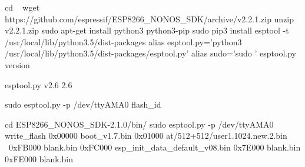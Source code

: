 

\begin{console}
cd ~
wget https://github.com/espressif/ESP8266_NONOS_SDK/archive/v2.2.1.zip
unzip v2.2.1.zip
sudo apt-get install python3 python3-pip
sudo pip3 install esptool -t /usr/local/lib/python3.5/dist-packages
alias esptool.py='python3 /usr/local/lib/python3.5/dist-packages/esptool.py'
alias sudo='sudo '
esptool.py version
\end{console}

\begin{screensmall}
esptool.py v2.6
2.6
\end{screensmall}

\begin{console}
sudo esptool.py -p /dev/ttyAMA0 flash_id 
\end{console}


\begin{console}
cd ESP8266_NONOS_SDK-2.1.0/bin/
sudo esptool.py -p /dev/ttyAMA0 write_flash 0x00000 boot_v1.7.bin 0x01000 at/512+512/user1.1024.new.2.bin \
 0xFB000 blank.bin 0xFC000 esp_init_data_default_v08.bin 0x7E000 blank.bin 0xFE000 blank.bin
\end{console}
